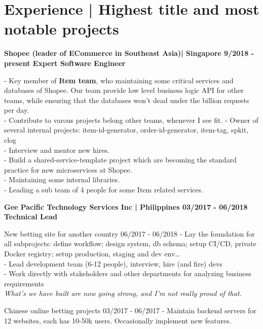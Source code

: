 \section*{Experience | \small{Highest title and most notable projects}}
{%
    \textbf{\event
      {Shopee (leader of ECommerce in Southeast Asia)| Singapore}
      {9/2018 - present}
      {Expert Software Engineer}
    }

  {
    - Key member of \textbf{Item team}, who maintaining some critical services
    and databases of Shopee. Our team provide low level business logic API for
    other teams, while ensuring that the databases won't dead under the billion
    requests per day. \\
    - Contribute to varous projects belong other teams, whenever I see fit.
    - Owner of several internal projects: item-id-generator, order-id-generator,
    item-tag, spkit, clog \\
    - Interview and mentor new hires. \\
    - Build a shared-service-template project which are becoming the standard
    practice for new microservices at Shopee. \\
    - Maintaining some internal libraries. \\
    - Leading a sub team of 4 people for some Item related services.
  }
  \break

  \textbf{\event
    {Gee Pacific Technology Services Inc | Philippines}
    {03/2017 - 06/2018}
    {Technical Lead}
  }

  \event
  {New betting site for another country}
  {06/2017 - 06/2018}
  {
    - Lay the foundation for all subprojects: define workflow; design system,
    db schema; setup CI/CD, private Docker registry; setup production, staging and
      dev env\dots
      \\
    - Lead development team (6-12 people), interview, hire (and fire) devs
      \\
    - Work directly with stakeholders and other departments for analyzing
      business requirements \\
    \textit{What's we have built are now going strong, and I'm not really proud of that.}
  }

  \event
  {Chinese online betting projects}
  {03/2017 - 06/2017}
  {
    - Maintain backend servers for 12 websites, each has 10-50k users. Occasionally implement new features.
  }

}
